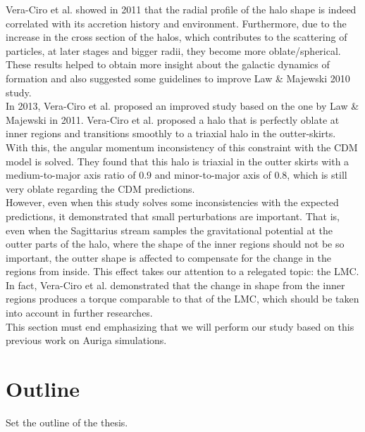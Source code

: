 Vera-Ciro et al.  showed in 2011 that the radial profile of the halo shape is indeed correlated with its accretion history and environment. Furthermore, due to the increase in the cross section of the halos, which contributes to the scattering of particles, at later stages and bigger radii, they become more oblate/spherical. These results helped to obtain more insight about the galactic dynamics of formation and also suggested some guidelines to improve Law \& Majewski 2010 study.\\

In 2013, Vera-Ciro et al. proposed an improved study based on the one by Law \& Majewski in 2011. Vera-Ciro et al. proposed a halo that is perfectly oblate at inner regions and transitions smoothly to a triaxial halo in the outter-skirts. With this, the angular momentum inconsistency of this constraint with the CDM model is solved. They found that this halo is triaxial in the outter skirts with a medium-to-major axis ratio of $0.9$ and minor-to-major axis of $0.8$, which is still very oblate regarding the CDM predictions.\\

However, even when this study solves some inconsistencies with the expected predictions, it demonstrated that small perturbations are important. That is, even when the Sagittarius stream samples the gravitational potential at the outter parts of the halo, where the shape of the inner regions should not be so important, the outter shape is affected to compensate for the change in the regions from inside. This effect takes our attention to a relegated topic: the LMC. In fact, Vera-Ciro et al. demonstrated that the change in shape from the inner regions produces a torque comparable to that of the LMC, which should be taken into account in further researches.\\



%

This section must end emphasizing that we will perform our study based on this previous work on Auriga simulations.

\section{Outline}

Set the outline of the thesis.
